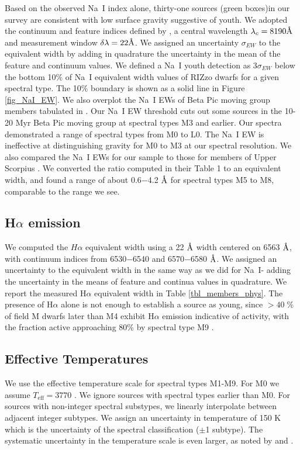 Based on the observed Na~I index alone, thirty-one sources (green boxes)in our survey are consistent with low surface gravity suggestive of youth.  We adopted the continuum and feature indices defined by \citet{2012AJ....143..114S}, a central wavelength $\lambda_c= 8190 \mbox{\normalfont\AA}$ and measurement window $\delta \lambda = 22 \mbox{\normalfont\AA}$.  We assigned an uncertainty $\sigma_{EW}$ to the equivalent width by adding in quadrature the uncertainty in the mean of the feature and continuum values.  We defined a Na~I youth detection as 3$\sigma_{EW}$ below the bottom 10\% of Na~I equivalent width values of RIZzo dwarfs for a given spectral type.  The 10\% boundary is shown as a solid line in Figure \ref{fig_NaI_EW}.  We also overplot the Na~I EWs of Beta Pic moving group members tabulated in \citet{2012AJ....143..114S}.  Our Na~I EW threshold cuts out some sources in the 10-20 Myr Beta Pic moving group \citep{2012AJ....143..114S} at spectral types M3 and earlier.  Our spectra demonstrated a range of spectral types from M0 to L0.  The Na~I EW is ineffective at distinguishing gravity for M0 to M3 at our spectral resolution.  We also compared the Na~I EWs for our sample to those for members of Upper Scorpius \citep{2006AJ....131.3016S}.  We converted the ratio computed in their Table 1 to an equivalent width, and found a range of about 0.6$-$4.2 $\mbox{\normalfont\AA}$ for spectral types M5 to M8, comparable to the range we see. 


\subsection{H$\alpha$ emission}
We computed the $H\alpha$ equivalent width using a 22 $\mbox{\normalfont\AA}$ width centered on 6563 $\mbox{\normalfont\AA}$, with continuum indices from 6530$-$6540 and 6570$-$6580 $\mbox{\normalfont\AA}$.  We assigned an uncertainty to the equivalent width in the same way as we did for Na~I- adding the uncertainty in the means of feature and continua values in quadrature.  We report the measured H$\alpha$ equivalent width in Table \ref{tbl_members_phys}.  The presence of H$\alpha$ alone is not enough to establish a source as young, since $>40\;$\% of field M dwarfs later than M4 exhibit H$\alpha$ emission indicative of activity, with the fraction active approaching 80\% by spectral type M9 \citep{2011AJ....141...97W}.  


\subsection{Effective Temperatures}
We use the \cite{2003ApJ...593.1093L} effective temperature scale for spectral types M1-M9.  For M0 we assume $T_{\mathrm{eff}}= 3770$ \citep{2013ApJS..208....9P}.  We ignore sources with spectral types earlier than M0.  For sources with non-integer spectral substypes, we linearly interpolate between adjacent integer subtypes.  We assign an uncertainty in temperature of 150 K which is the uncertainty of the spectral classification ($\pm$1 subtype).  The systematic uncertainty in the temperature scale is even larger, as noted by \citet{2013ApJS..208....9P} and \citet{2010ApJS..186...63R}.

